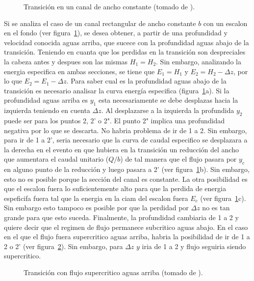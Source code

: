 \documentclass[11pt, oneside]{article}
\begin{document}
\begin{figure}[h]
\centering
\caption{Transici\'on en un canal de ancho constante (tomado de \cite{Chau}).}
\label{fig12}
\end{figure}

Si se analiza el caso de un canal rectangular de ancho constante $b$ con un escalon en el fondo (ver figura~\ref{fig12}), se desea obtener, a partir de una profundidad y velocidad conocida aguas arriba, que sucece con la profundidad aguas abajo de la transici\'on. Teniendo en cuanta que los perdidas en la transici\'on son despreciales la cabeza antes y despues son las mismas $H_1 = H_2$. Sin embargo, analizando la energia especifica en ambas secciones, se tiene que $E_1 = H_1$ y $E_2 = H_2-\Delta z$, por lo que $E_2 = E_1 - \Delta z$. Para saber cual es la profundidad aguas abajo de la transici\'on es necesario analisar la curva energ\'ia especifica (figura~\ref{fig12}a). Si la profundidad aguas arriba es $y_1$ esta necesariamente se debe desplazas hacia la izquierda teniendo en cuenta $\Delta z$. Al desplazarse a la izquierda la profundida $y_2$ puede ser para los puntos 2, 2' o 2". El punto 2" implica una profundidad negativa por lo que se descarta. No habria problema de ir de 1 a 2. Sin embargo, para ir de 1 a 2', seria necesario que la curva de caudal especifico se desplazara a la derecha en el evento en que hubiera en la transici\'on un reducci\'on del ancho que aumentara el caudal unitario ($Q/b$) de tal manera que el flujo pasara por $y_c$ en alguno punto de la reducci\'on y luego pasara a 2' (ver figura~\ref{fig12}b). Sin embargo, esto no es posible porque la secci\'on del canal es constante. La otra posibilidad es que el escalon fuera lo suficientemente alto para que la perdida de energia espeficifa fuera tal que la energia en la ciam del escalon fuera $E_c$ (ver figura~\ref{fig12}c). Sin embargo esto tampoco es posible por que la perdidad por $\Delta z$ no es tan grande para que esto suceda. Finalmente, la profundidad cambiaria de 1 a 2 y quiere decir que el regimen de flujo permanece subcritico aguas abajo. En el caso en el que el flujo fuera supercritico aguas arriba, habria la posibilidad de ir de 1 a 2 o 2' (ver figura~\ref{fig13}). Sin embargo, para $\Delta z$ $y$ iria de 1 a 2 y flujo seguiria siendo supercritico. 

\begin{figure}[h]
\centering
\caption{Transici\'on con flujo supercritico aguas arriba (tomado de \cite{Chau}).}
\label{fig13}
\end{figure}
\end{document}

